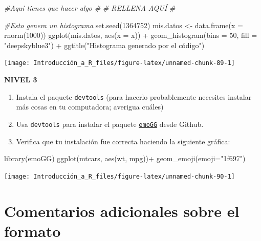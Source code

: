 \documentclass[]{tufte-book}
\newenvironment{Shaded}{}{}
\newcommand{\AttributeTok}[1]{\textcolor[rgb]{0.49,0.56,0.16}{#1}}
\newcommand{\CommentTok}[1]{\textcolor[rgb]{0.38,0.63,0.69}{\textit{#1}}}
\newcommand{\DecValTok}[1]{\textcolor[rgb]{0.25,0.63,0.44}{#1}}
\newcommand{\FunctionTok}[1]{\textcolor[rgb]{0.02,0.16,0.49}{#1}}
\newcommand{\NormalTok}[1]{#1}
\newcommand{\OtherTok}[1]{\textcolor[rgb]{0.00,0.44,0.13}{#1}}
\newcommand{\SpecialCharTok}[1]{\textcolor[rgb]{0.25,0.44,0.63}{#1}}
\newcommand{\StringTok}[1]{\textcolor[rgb]{0.25,0.44,0.63}{#1}}
\providecommand{\tightlist}{%
  \setlength{\itemsep}{0pt}\setlength{\parskip}{0pt}}
\begin{document}
\begin{Shaded}
\begin{Highlighting}[]
\CommentTok{\#Aquí tienes que hacer algo}
\CommentTok{\#}
\CommentTok{\# RELLENA AQUÍ}
\CommentTok{\#}

\CommentTok{\#Esto genera un histograma}
\FunctionTok{set.seed}\NormalTok{(}\DecValTok{1364752}\NormalTok{)}
\NormalTok{mis.datos }\OtherTok{\textless{}{-}} \FunctionTok{data.frame}\NormalTok{(}\AttributeTok{x =} \FunctionTok{rnorm}\NormalTok{(}\DecValTok{1000}\NormalTok{))}
\FunctionTok{ggplot}\NormalTok{(mis.datos, }\FunctionTok{aes}\NormalTok{(}\AttributeTok{x =}\NormalTok{ x)) }\SpecialCharTok{+} 
  \FunctionTok{geom\_histogram}\NormalTok{(}\AttributeTok{bins =} \DecValTok{50}\NormalTok{, }\AttributeTok{fill =} \StringTok{"deepskyblue3"}\NormalTok{) }\SpecialCharTok{+}
  \FunctionTok{ggtitle}\NormalTok{(}\StringTok{"Histograma generado por el código"}\NormalTok{)}
\end{Highlighting}
\end{Shaded}

\texttt{[image: Introducción\_a\_R\_files/figure-latex/unnamed-chunk-89-1]}

\textbf{NIVEL 3}

\begin{enumerate}
\def\labelenumi{\arabic{enumi}.}
\tightlist
\item
  Instala el paquete \texttt{devtools} (para hacerlo probablemente
  necesites instalar más cosas en tu computadora; averigua cuáles)
\item
  Usa \texttt{devtools} para instalar el paquete
  \href{https://github.com/dill/emoGG}{\texttt{emoGG}} desde Github.
\item
  Verifica que tu instalación fue correcta haciendo la siguiente
  gráfica:
\end{enumerate}

\begin{Shaded}
\begin{Highlighting}[]
\FunctionTok{library}\NormalTok{(emoGG)}
\FunctionTok{ggplot}\NormalTok{(mtcars, }\FunctionTok{aes}\NormalTok{(wt, mpg))}\SpecialCharTok{+} \FunctionTok{geom\_emoji}\NormalTok{(}\AttributeTok{emoji=}\StringTok{"1f697"}\NormalTok{)}
\end{Highlighting}
\end{Shaded}

\texttt{[image: Introducción\_a\_R\_files/figure-latex/unnamed-chunk-90-1]}

\hypertarget{comentarios-adicionales-sobre-el-formato}{%
\chapter{Comentarios adicionales sobre el
formato}\label{comentarios-adicionales-sobre-el-formato}}
\end{document}
